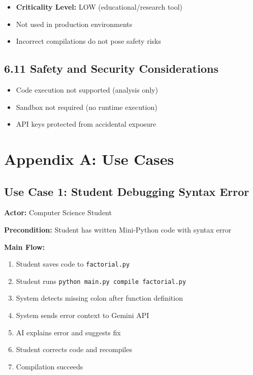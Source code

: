 \documentclass[a4paper,11pt]{article}
\begin{document}
\begin{itemize}
    \item \textbf{Criticality Level:} LOW (educational/research tool)
    \item Not used in production environments
    \item Incorrect compilations do not pose safety risks
\end{itemize}

\subsection{6.11 Safety and Security Considerations}

\begin{itemize}
    \item Code execution not supported (analysis only)
    \item Sandbox not required (no runtime execution)
    \item API keys protected from accidental exposure
\end{itemize}

\clearpage

\section{Appendix A: Use Cases}

\subsection{Use Case 1: Student Debugging Syntax Error}

\textbf{Actor:} Computer Science Student

\textbf{Precondition:} Student has written Mini-Python code with syntax error

\textbf{Main Flow:}
\begin{enumerate}
    \item Student saves code to \texttt{factorial.py}
    \item Student runs \texttt{python main.py compile factorial.py}
    \item System detects missing colon after function definition
    \item System sends error context to Gemini API
    \item AI explains error and suggests fix
    \item Student corrects code and recompiles
    \item Compilation succeeds
\end{enumerate}
\end{document}
